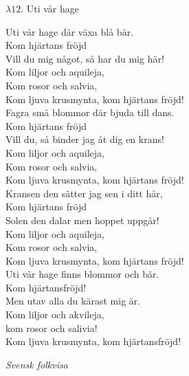\documentclass[a6paper,10pt]{article}
\newcommand{\notis}[1]{\begin{flushright}\textit{#1}\end{flushright}}
\begin{document}
\setlength{\oddsidemargin}{-0.37in}
\noindent
\begin{center}
\Large $\lambda12$. Uti vår hage\\
\end{center}
Uti vår hage där växa blå bär.\\
Kom hjärtans fröjd\\
Vill du mig något, så har du mig här!\\
Kom liljor och aquileja,\\
Kom rosor och salvia,\\
Kom ljuva krusmynta, kom hjärtans fröjd!
\vspace{5pt}\\
Fagra små blommor där bjuda till dans.\\
Kom hjärtans fröjd\\
Vill du, så binder jag åt dig en krans!\\
Kom liljor och aquileja,\\
Kom rosor och salvia,\\
Kom ljuva krusmynta, kom hjärtans fröjd!
\vspace{5pt}\\
Kransen den sätter jag sen i ditt hår,\\
Kom hjärtans fröjd\\
Solen den dalar men hoppet uppgår!\\
Kom liljor och aquileja,\\
Kom rosor och salvia,\\
Kom ljuva krusmynta, kom hjärtans fröjd!
\vspace{5pt}\\
Uti vår hage finns blommor och bär. \\
Kom hjärtansfröjd! \\
Men utav alla du kärast mig är. \\
Kom liljor och akvileja,\\
kom rosor och salivia! \\
Kom ljuva krusmynta, kom hjärtansfröjd!
\notis{Svensk folkvisa}
\end{document}
